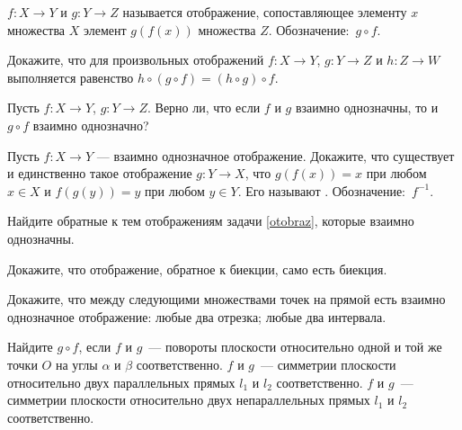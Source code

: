 \documentclass[a4paper,12pt]{article}
\begin{document}
 $f\colon X\to Y$ и $g\colon Y\to Z$
называется отображение, сопоставляющее элементу $x$ множества $X$
элемент $g(f(x))$ множества $Z$. Обозначение:~$g\circ f$.

Докажите, что для произвольных отображений $f\colon X\to Y$,
$g\colon Y\to Z$ и $h\colon Z\to W$ выполняется
равенство $h\circ(g\circ f)=(h\circ g)\circ f$.


Пусть $f\colon X\to Y$, $g\colon Y\to Z$. Верно ли, что если $f$ и $g$
взаимно однозначны, то и $g\circ f$ взаимно однозначно?

Пусть $f\colon X \to Y$ --- взаимно однозначное отображение.
Докажите, что существует и единственно такое отображение $g\colon Y \to X$,
что $g(f(x)) = x$ при любом $x\in X$ и $f(g(y)) = y$ при любом $y\in Y$.
Его называют . Обозначение:~$f^{-1}$.

Найдите обратные к тем отображениям задачи \ref{otobraz}, которые взаимно однозначны.


  Докажите, что отображение, обратное к биекции, само есть биекция.




 Докажите, что между следующими множествами точек
на прямой есть взаимно однозначное отображение:
 любые два отрезка;
 любые два интервала.



Найдите $g\circ f$, если
$f$ и $g$~--- повороты плоскости относительно одной и той же точки
$O$ на углы $\alpha$ и $\beta$ соответственно.
$f$ и $g$~--- симметрии плоскости относительно двух параллельных
прямых $l_1$ и $l_2$ соответственно. %
$f$ и $g$~--- симметрии плоскости относительно двух непараллельных прямых
$l_1$ и $l_2$ соответственно.







\vspace*{-4mm}
\end{document}
